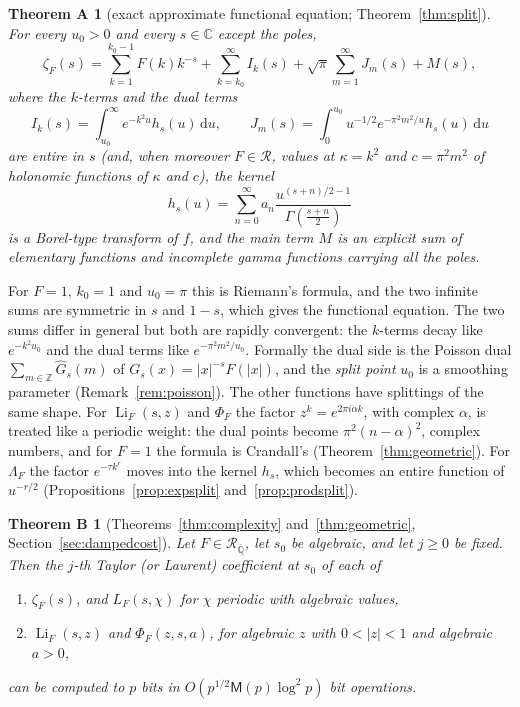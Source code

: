 \documentclass[11pt,reqno]{amsart}
\newtheorem*{theoremA}{Theorem A}
\newtheorem*{theoremB}{Theorem B}
\theoremstyle{definition}
\theoremstyle{remark}
\newcommand{\Li}{\operatorname{Li}}
\newcommand{\dd}{\,\mathrm{d}}
\newcommand{\Qbar}{\overline{\mathbb{Q}}}
\newcommand{\Reg}{\mathcal{R}}
\newcommand{\RegQ}{\mathcal{R}_{\Qbar}}
\newcommand{\ZZ}{\mathbb{Z}}
\newcommand{\CC}{\mathbb{C}}
\newcommand{\Mul}{\mathsf{M}}
\begin{document}
\begin{theoremA}[exact approximate functional equation; Theorem~\ref{thm:split}]
For every $u_0 > 0$ and every $s \in \CC$ except the poles,
\[
  \zeta_F(s) = \sum_{k=1}^{k_0-1}F(k)k^{-s} + \sum_{k=k_0}^{\infty}I_k(s)
  + \sqrt\pi\sum_{m=1}^{\infty}J_m(s) + M(s),
\]
where the \emph{$k$-terms} and the \emph{dual terms}
\[
  I_k(s) = \int_{u_0}^\infty e^{-k^2u}h_s(u)\dd u, \qquad
  J_m(s) = \int_0^{u_0}u^{-1/2}e^{-\pi^2m^2/u}h_s(u)\dd u
\]
are entire in $s$ (and, when moreover $F \in \Reg$, values at $\kappa = k^2$ and $c = \pi^2m^2$ of holonomic functions of
$\kappa$ and $c$), the \emph{kernel}
\[
h_s(u) = \sum_{n=0}^{\infty} a_n \frac{u^{(s+n)/2-1}}{\Gamma(\frac{s+n}{2})}
\]
is a Borel-type transform of $f$, and the \emph{main term} $M$ is an
explicit sum of elementary functions and incomplete gamma functions carrying all the poles.
\end{theoremA}

For $F = 1$, $k_0 = 1$ and $u_0 = \pi$ this is Riemann's formula, and the two infinite sums
are symmetric in $s$ and $1-s$, which gives the
functional equation. The two sums differ in general
but both are rapidly convergent: the $k$-terms decay
like $e^{-k^2u_0}$ and the dual terms like $e^{-\pi^2m^2/u_0}$.
Formally the dual side is the Poisson dual
$\sum_{m\in\ZZ} \widehat G_s(m)$ of $G_s(x) = |x|^{-s}F(|x|)$, and the \emph{split point} $u_0$ is a smoothing parameter
(Remark~\ref{rem:poisson}). The other functions have splittings of the same shape. For $\Li_F(s,z)$ and $\Phi_F$ the
factor $z^k = e^{2\pi i\alpha k}$, with complex $\alpha$, is treated like a periodic weight: the dual points become
$\pi^2(n-\alpha)^2$, complex numbers, and for $F = 1$ the formula is Crandall's \cite{Cra12}
(Theorem~\ref{thm:geometric}). For $\Lambda_F$ the factor $e^{-\tau k^r}$ moves into the kernel $h_s$, which
becomes an entire function of $u^{-r/2}$ (Propositions~\ref{prop:expsplit} and~\ref{prop:prodsplit}).

\begin{theoremB}[Theorems~\ref{thm:complexity} and~\ref{thm:geometric}, Section~\ref{sec:dampedcost}]
Let $F \in \RegQ$, let $s_0$ be algebraic, and let
$j \ge 0$ be fixed. Then the $j$-th Taylor (or Laurent) coefficient at $s_0$ of each of
\begin{enumerate}
\item $\zeta_F(s)$, and $L_F(s,\chi)$ for $\chi$ periodic with algebraic values,
\item $\Li_F(s,z)$ and $\Phi_F(z,s,a)$, for algebraic $z$ with $0 < |z| < 1$ and algebraic $a > 0$,
\end{enumerate}
can be computed to $p$ bits in $O(p^{1/2}\Mul(p)\log^2 p)$ bit operations.
\end{theoremB}
\end{document}
